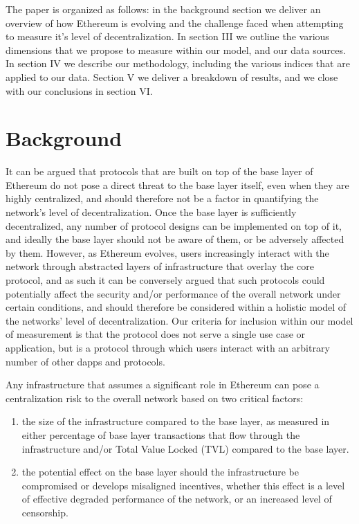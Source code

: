 \documentclass[conference]{IEEEtran}
\begin{document}
The paper is organized as follows: in the background section we deliver an overview of how Ethereum is evolving and the challenge faced when attempting to measure it's level of decentralization.  In section III we outline the various dimensions that we propose to measure within our model, and our data sources.  In section IV we describe our methodology, including the various indices that are applied to our data.  Section V we deliver a breakdown of results, and we close with our conclusions in section VI.

\section{Background}

It can be argued that protocols that are built on top of the base layer of Ethereum do not pose a direct threat to the base layer itself, even when they are highly centralized, and should therefore not be a factor in quantifying the network's level of decentralization.  Once the base layer is sufficiently decentralized, any number of protocol designs can be implemented on top of it, and ideally the base layer should not be aware of them, or be adversely affected by them.  However, as Ethereum evolves, users increasingly interact with the network through abstracted layers of infrastructure that overlay the core protocol, and as such it can be conversely argued that such protocols could potentially affect the security and/or performance of the overall network under certain conditions, and should therefore be considered within a holistic model of the networks' level of decentralization.   Our criteria for inclusion within our model of measurement is that the protocol does not serve a single use case or application, but is a protocol through which users interact with an arbitrary number of other dapps and protocols.

Any infrastructure that assumes a significant role in Ethereum can pose a centralization risk to the overall network based on two critical factors:
\begin{enumerate}[label=\alph*.]
\item the size of the infrastructure compared to the base layer, as measured in either percentage of base layer transactions that flow through the infrastructure and/or Total Value Locked (TVL) compared to the base layer.
\item the potential effect on the base layer should the infrastructure be compromised or develops misaligned incentives, whether this effect is a level of effective degraded performance of the network, or an increased level of censorship.
\end{enumerate}
\end{document}
